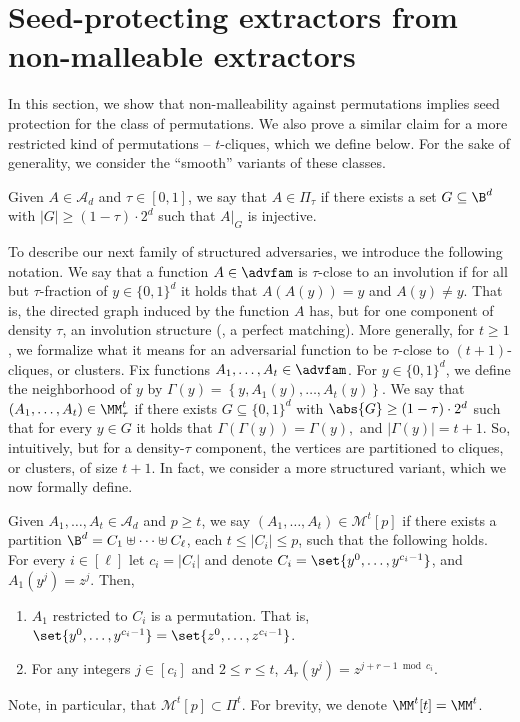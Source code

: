 %
\section{Seed-protecting   %
extractors from non-malleable extractors}

In this section, we show that non-malleability against permutations
implies seed protection for the class of permutations. We also prove a similar claim for a more
restricted kind of permutations -- $t$-cliques, which we define below. For the sake of generality, we consider the ``smooth'' variants of these classes.

\begin{definition}\label{def:smooth2}
Given $A \in \mathcal{A}_d$ and $\tau \in [0,1]$, we say that $A \in \Pi_\tau$ if there exists a set $G \subseteq \B^d$ 
with $|G| \ge (1-\tau) \cdot 2^d$ such that $A|_G$ is injective.
\end{definition}

To describe our next family of structured adversaries, we introduce the following notation. We say that a function $A \in \advfam$ is $\tau$-close to an involution if for all but $\tau$-fraction of $y \in \{0,1\}^d$ it holds that $A(A(y)) = y$ and $A(y) \neq y$. That is, the directed graph induced by the function $A$ has, but for one component of density $\tau$, an involution structure (\ie, a perfect matching). More generally, for $t \ge 1$, we formalize what it means for an adversarial function to be $\tau$-close to  $(t+1)$-cliques, or clusters. Fix functions $A_1,\ldots,A_t \in \advfam$. For $y\in \{0,1\}^d$, we define the neighborhood of $y$ by
	$
	\Gamma(y) = \left\{y,A_1(y),\ldots, A_t(y)\right\}.
	$	
	We say that $(A_1,\ldots,A_t) \in \MM_\tau^t$ if there exists $G \subseteq \{0,1\}^d$ with $\abs{G} \geq (1-\tau)\cdot2^d$ such that for every $y \in G$ it holds that
	$
	\Gamma(\Gamma(y)) = \Gamma(y),
	$
	and $|\Gamma(y)| = t+1$. So, intuitively, but for a density-$\tau$ component, the vertices are partitioned to cliques, or clusters, of size $t+1$. In fact, we consider a more structured variant, which we now formally define.


\begin{definition}[$t$-cliques]\label{def:cliques}
Given $A_1,\ldots,A_t \in \mathcal{A}_d$ and $p \ge t$, we say
$\left(A_1,\ldots,A_t \right) \in \mathcal{M}^{t}[p]$ if there exists a
partition $\B^d = C_1 \uplus \cdots \uplus C_\ell$, each $t \le |C_i| \le p$, such that
the following holds. For every $i \in [\ell]$ let $c_i = |C_i|$ and denote $C_i = \set{y^{0},\ldots,y^{c_i-1}}$, and $A_{1}\left(y^{j}\right) = z^{j}$. Then,
\begin{enumerate}
    \item $A_1$ restricted to $C_i$ is a permutation. That is, $\set{y^{0},\ldots,y^{c_i-1}} = \set{z^{0},\ldots,z^{c_i-1}}$. 
    \item For any integers $j \in [c_i]$ and $2 \le r \le t$, $A_{r}\left( y^j \right) = z^{j+ r-1 \bmod c_i}$.
\end{enumerate}
Note, in particular, that $\mathcal{M}^t[p] \subset \Pi^t$. For brevity, we denote $\MM^t[t] = \MM^t$.
\end{definition}

